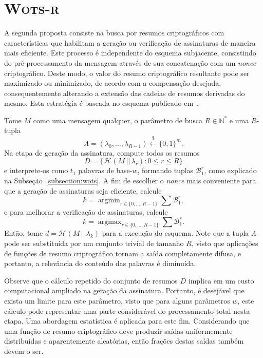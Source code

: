 \documentclass{ufsctex/ufsctex}
\newcommand{\hash}[2][]{\mathcal{H}^{#1} (#2)}
\newcommand{\concat}{\, \vert{} \vert{} \,}
\newcommand{\binwds}[1]{\{0, 1\}^{#1}}
\newcommand{\random}{\stackrel{\$}{\longleftarrow}}
\newcommand{\wotsr}{\textsc{Wots-r}}
\DeclareMathOperator*{\argmin}{argmin}
\DeclareMathOperator*{\argmax}{argmax}
\begin{document}
\section{\wotsr{}}\label{section:wotsr}

A segunda proposta consiste na busca por resumos criptográficos com
características que habilitam a geração ou verificação de assinaturas de
maneira mais eficiente. Este processo é independente do esquema subjacente,
consistindo do pré-processamento da mensagem através de sua concatenação com um
\emph{nonce} criptográfico. Deste modo, o valor do resumo criptográfico
resultante pode ser maximizado ou minimizado, de acordo com a compensação
desejada, consequentemente alterando a extensão das cadeias de resumos
derivadas do mesmo. Esta estratégia é baseada no esquema publicado
em~\cite{Steinwandt2008}.

Tome $M$ como uma mensagem qualquer, o parâmetro de busca $R \in
\mathbb{N}^{*}$ e uma $R$-tupla
\begin{equation}
  \Lambda = (\lambda_0, \dots, \lambda_{R - 1})
    \random{} \binwds{m}.
\end{equation}
Na etapa de geração da assinatura, compute todos os resumos
\begin{equation}
  D = \{\hash{M \concat \lambda_r} : 0 \leq r \leq R\}
\end{equation}
e interprete-os como $t_1$ palavras de base-$w$, formando tuplas
$\mathcal{B}_{1}^{r}$, como explicado na Subseção~\ref{subsection:wots}. A fim
de escolher o \emph{nonce} mais conveniente para que a geração de assinaturas
seja eficiente, calcule
\begin{equation}
  k = \argmin_{r \in \{0, \dots, R - 1\}} \sum \mathcal{B}_{1}^{r},
\end{equation}
e para melhorar a verificação de assinaturas, calcule
\begin{equation}
  k = \argmax_{r \in \{0, \dots, R - 1\}} \sum \mathcal{B}_{1}^{r}.
\end{equation}
Então, tome $d = \hash{M \concat \lambda_k}$ para a execução do esquema. Note
que a tupla $\Lambda$ pode ser substituída por um conjunto trivial de tamanho
$R$, visto que aplicações de funções de resumo criptográfico tornam a saída
completamente difusa, e portanto, a relevância do conteúdo das palavras é
diminuída.

Observe que o cálculo repetido do conjunto de resumos $D$ implica em um custo
computacional ampliado na geração da assinatura. Portanto, é desejável que
exista um limite para este parâmetro, visto que para alguns parâmetros $w$,
este cálculo pode representar uma parte considerável do processamento total
nesta etapa. Uma abordagem estatística é aplicada para este fim. Considerando
que uma função de resumo criptográfico deve produzir saídas uniformemente
distribuídas e aparentemente aleatórias, então frações destas saídas também
devem o ser.
\end{document}
